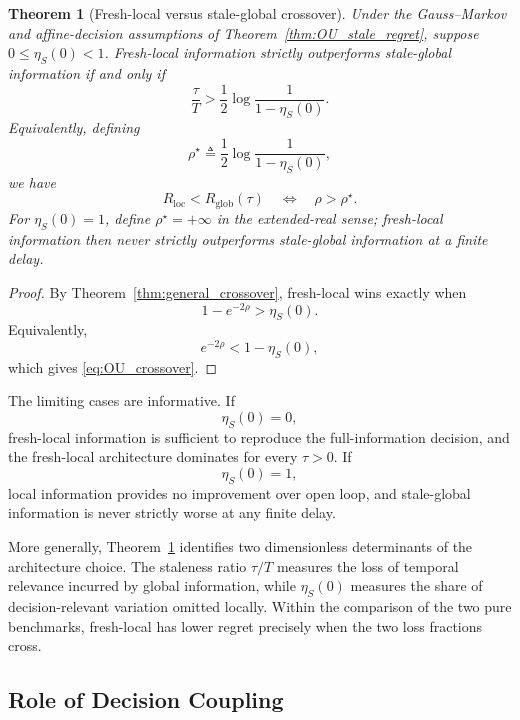 \documentclass[11pt]{article}
\newtheorem{theorem}{Theorem}
\begin{document}
\begin{theorem}[Fresh-local versus stale-global crossover]
\label{thm:local_global_crossover}
Under the Gauss--Markov and affine-decision assumptions of
Theorem~\ref{thm:OU_stale_regret}, suppose
$0\le\eta_S(0)<1$. Fresh-local information strictly
outperforms stale-global information if and only if
\begin{equation}
    \boxed{
    \frac{\tau}{T}
    >
    \frac{1}{2}
    \log
    \frac{1}{1-\eta_S(0)}.
    }
    \label{eq:OU_crossover}
\end{equation}
Equivalently, defining
\begin{equation}
    \rho^\star
    \triangleq
    \frac{1}{2}
    \log
    \frac{1}{1-\eta_S(0)},
    \label{eq:rho_star_general}
\end{equation}
we have
\begin{equation}
    R_{\mathrm{loc}}
    <
    R_{\mathrm{glob}}(\tau)
    \quad\Longleftrightarrow\quad
    \rho>\rho^\star.
    \label{eq:rho_crossover}
\end{equation}
For $\eta_S(0)=1$, define $\rho^\star=+\infty$ in the
extended-real sense; fresh-local information then never strictly outperforms
stale-global information at a finite delay.
\end{theorem}

\begin{proof}
By Theorem~\ref{thm:general_crossover}, fresh-local wins exactly when
\[
    1-e^{-2\rho}
    >
    \eta_S(0).
\]
Equivalently,
\[
    e^{-2\rho}
    <
    1-\eta_S(0),
\]
which gives \eqref{eq:OU_crossover}.
\end{proof}

The limiting cases are informative. If
\[
    \eta_S(0)=0,
\]
fresh-local information is sufficient to reproduce the full-information
decision, and the fresh-local architecture dominates for every $\tau>0$. If
\[
    \eta_S(0)=1,
\]
local information provides no improvement over open loop, and stale-global
information is never strictly worse at any finite delay.

More generally, Theorem~\ref{thm:local_global_crossover} identifies two
dimensionless determinants of the architecture choice. The staleness ratio
$\tau/T$ measures the loss of temporal relevance incurred by global
information, while $\eta_S(0)$ measures the share of decision-relevant
variation omitted locally. Within the comparison of the two
pure benchmarks, fresh-local has lower regret precisely when the two loss
fractions cross.

\subsection{Role of Decision Coupling}
\label{subsec:coupling_example}
\end{document}
